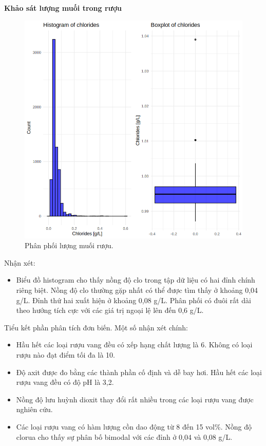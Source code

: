 \textbf{Khảo sát lượng muối trong rượu}
\begin{figure}[H]
    \centering
    \includegraphics[width=0.75\columnwidth]{wine_colors/wine_chlorides.png}
    \caption{Phân phối lượng muối rượu.}
    \label{fig:wine_chlorides}
\end{figure}
Nhận xét:
\begin{itemize}
    \item Biểu đồ histogram cho thấy nồng độ clo trong tập dữ liệu có hai đỉnh chính riêng biệt. Nồng độ clo thường gặp nhất có thể được tìm thấy ở khoảng 0,04 g/L. Đỉnh thứ hai xuất hiện ở khoảng 0,08 g/L. Phân phối có đuôi rất dài theo hướng tích cực với các giá trị ngoại lệ lên đến 0,6 g/L.
\end{itemize}

Tiểu kết phần phân tích đơn biến. Một số nhận xét chính:
\begin{itemize}
    \item Hầu hết các loại rượu vang đều có xếp hạng chất lượng là 6. Không có loại rượu nào đạt điểm tối đa là 10.
    \item Độ axit được đo bằng các thành phần cố định và dễ bay hơi. Hầu hết các loại rượu vang đều có độ pH là 3,2.
    \item Nồng độ lưu huỳnh dioxit thay đổi rất nhiều trong các loại rượu vang được nghiên cứu.
    \item Các loại rượu vang có hàm lượng cồn dao động từ 8 đến 15 vol\%. Nồng độ clorua cho thấy sự phân bố bimodal với các đỉnh ở 0,04 và 0,08 g/L.
\end{itemize}

